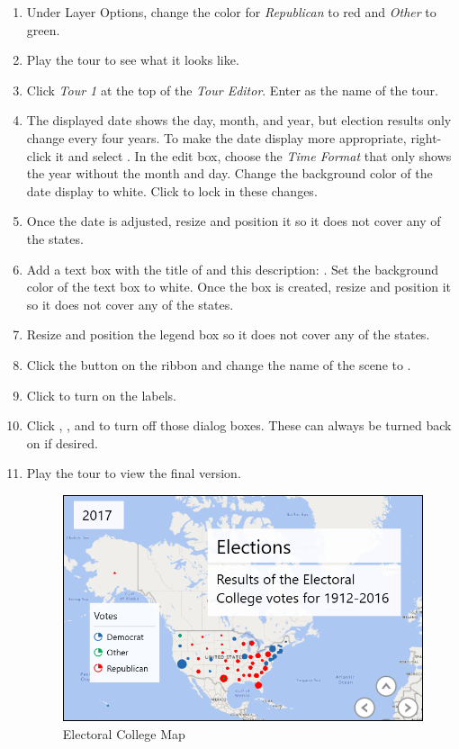 \begin{enumerate}
	\item Under Layer Options, change the color for \textit{Republican} to red and \textit{Other} to green.
	\item Play the tour to see what it looks like.
	\item Click \textit{Tour 1} at the top of the \textit{Tour Editor}. Enter  as the name of the tour. 
	\item The displayed date shows the day, month, and year, but election results only change every four years. To make the date display more appropriate, right-click it and select . In the edit box, choose the \textit{Time Format} that only shows the year without the month and day. Change the background color of the date display to white. Click  to lock in these changes. 
	\item Once the date is adjusted, resize and position it so it does not cover any of the states. 
	\item Add a text box with the title of  and this description: . Set the background color of the text box to white. Once the box is created, resize and position it so it does not cover any of the states.
	\item Resize and position the legend box so it does not cover any of the states.
	\item Click the  button on the ribbon and change the name of the scene to .
	\item Click  to turn on the labels.
	\item Click , , and  to turn off those dialog boxes. These can always be turned back on if desired.
	\item Play the tour to view the final version.
	
	\begin{figure}[H]
		\centering
		\includegraphics[width=\maxwidth{.95\linewidth}]{gfx/ch08_fig80}
		\caption{Electoral College Map}
		\label{08:fig80}
	\end{figure}
	

\end{enumerate}
